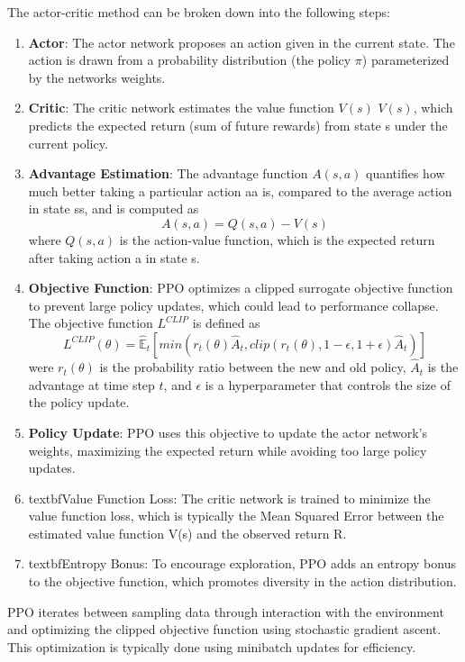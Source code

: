 The actor-critic method can be broken down into the following steps:
\begin{enumerate}
    \item \textbf{Actor}: The actor network proposes an action given in the current state. The action is drawn from a probability distribution (the policy $\pi$) parameterized by the networks weights.
    \item \textbf{Critic}: The critic network estimates the value function $V(s)$ $V(s)$, which predicts the expected return (sum of future rewards) from state s under the current policy.
    \item \textbf{Advantage Estimation}: The advantage function $A(s,a)$ quantifies how much better taking a particular action aa is, compared to the average action in state ss, and is computed as 
    \begin{equation}
        A(s,a) = Q(s,a) - V(s)
    \end{equation}
    where $Q(s,a)$ is the action-value function, which is the expected return after taking action a in state s.
    \item \textbf{Objective Function}:  PPO optimizes a clipped surrogate objective function to prevent large policy updates, which could lead to performance collapse. The objective function $L^{CLIP}$ is defined as
    \begin{equation}
        L^{CLIP}(\theta) = \hat{\mathbb{E}}_t[min(r_t(\theta)\hat{A}_t, clip(r_t(\theta), 1-\epsilon, 1+\epsilon)\hat{A}_t)]
    \end{equation}
    were $r_t(\theta)$ is the probability ratio between the new and old policy, $\hat{A}_t$ is the advantage at time step $t$, and $\epsilon$ is a hyperparameter that controls the size of the policy update.
    \item \textbf{Policy Update}: PPO uses this objective to update the actor network's weights, maximizing the expected return while avoiding too large policy updates.
    \item textbf{Value Function Loss}: The critic network is trained to minimize the value function loss, which is typically the Mean Squared Error between the estimated value function V(s) and the observed return R.
    \item textbf{Entropy Bonus}: To encourage exploration, PPO adds an entropy bonus to the objective function, which promotes diversity in the action distribution.
\end{enumerate}


PPO iterates between sampling data through interaction with the environment and optimizing the clipped objective function using stochastic gradient ascent. This optimization is typically done using minibatch updates for efficiency.

